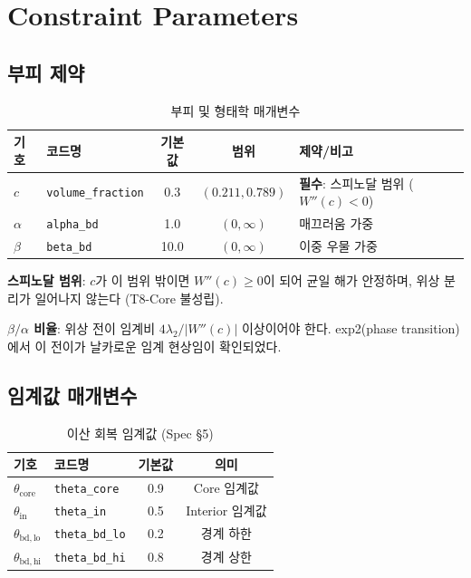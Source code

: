 \section{Constraint Parameters}
\label{app:constraint-params}


\subsection{부피 제약}

\begin{table}[h]
\centering
\caption{부피 및 형태학 매개변수}
\label{tab:volume-params}
\begin{tabular}{llccp{5cm}}
\hline
\textbf{기호} & \textbf{코드명} & \textbf{기본값} & \textbf{범위} & \textbf{제약/비고} \\
\hline
$c$ & \texttt{volume\_fraction} & 0.3 & $(0.211, 0.789)$ & \textbf{필수}: 스피노달 범위 ($W''(c) < 0$) \\
$\alpha$ & \texttt{alpha\_bd} & 1.0 & $(0, \infty)$ & 매끄러움 가중 \\
$\beta$ & \texttt{beta\_bd} & 10.0 & $(0, \infty)$ & 이중 우물 가중 \\
\hline
\end{tabular}
\end{table}

\textbf{스피노달 범위}: $c$가 이 범위 밖이면 $W''(c) \geq 0$이 되어 균일 해가 안정하며, 위상 분리가 일어나지 않는다 (T8-Core 불성립).

\textbf{$\beta/\alpha$ 비율}: 위상 전이 임계비 $4\lambda_2/|W''(c)|$ 이상이어야 한다. exp2(phase transition)에서 이 전이가 날카로운 임계 현상임이 확인되었다.


\subsection{임계값 매개변수}

\begin{table}[h]
\centering
\caption{이산 회복 임계값 (Spec \S5)}
\label{tab:threshold-params}
\begin{tabular}{llcc}
\hline
\textbf{기호} & \textbf{코드명} & \textbf{기본값} & \textbf{의미} \\
\hline
$\theta_{\mathrm{core}}$ & \texttt{theta\_core} & 0.9 & Core 임계값 \\
$\theta_{\mathrm{in}}$ & \texttt{theta\_in} & 0.5 & Interior 임계값 \\
$\theta_{\mathrm{bd,lo}}$ & \texttt{theta\_bd\_lo} & 0.2 & 경계 하한 \\
$\theta_{\mathrm{bd,hi}}$ & \texttt{theta\_bd\_hi} & 0.8 & 경계 상한 \\
\hline
\end{tabular}
\end{table}


